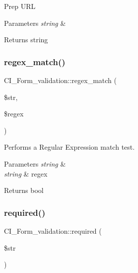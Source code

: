 Prep U\+RL


\begin{DoxyParams}{Parameters}
{\em string} & \\
\hline
\end{DoxyParams}
\begin{DoxyReturn}{Returns}
string 
\end{DoxyReturn}
\mbox{\label{class_c_i___form__validation_a5360f59cb1b624ea9f8aec348a9fc3bc}} 
\subsubsection{\texorpdfstring{regex\+\_\+match()}{regex\_match()}}
{\footnotesize\ttfamily C\+I\+\_\+\+Form\+\_\+validation\+::regex\+\_\+match (\begin{DoxyParamCaption}\item[{}]{\$str,  }\item[{}]{\$regex }\end{DoxyParamCaption})}

Performs a Regular Expression match test.


\begin{DoxyParams}{Parameters}
{\em string} & \\
\hline
{\em string} & regex \\
\hline
\end{DoxyParams}
\begin{DoxyReturn}{Returns}
bool 
\end{DoxyReturn}
\mbox{\label{class_c_i___form__validation_a199cc68b369723805f9ab59459dfc427}} 
\subsubsection{\texorpdfstring{required()}{required()}}
{\footnotesize\ttfamily C\+I\+\_\+\+Form\+\_\+validation\+::required (\begin{DoxyParamCaption}\item[{}]{\$str }\end{DoxyParamCaption})}

